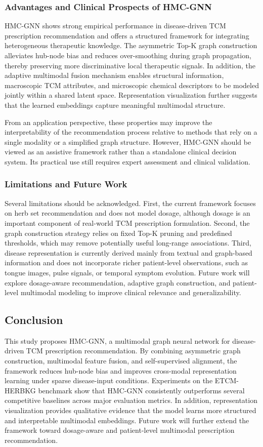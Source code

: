\documentclass[a4paper,fleqn]{cas-dc}
\begin{document}
\subsubsection{Advantages and Clinical Prospects of HMC-GNN}
HMC-GNN shows strong empirical performance in disease-driven TCM prescription recommendation and offers a structured framework for integrating heterogeneous therapeutic knowledge. The asymmetric Top-K graph construction alleviates hub-node bias and reduces over-smoothing during graph propagation, thereby preserving more discriminative local therapeutic signals. In addition, the adaptive multimodal fusion mechanism enables structural information, macroscopic TCM attributes, and microscopic chemical descriptors to be modeled jointly within a shared latent space. Representation visualization further suggests that the learned embeddings capture meaningful multimodal structure.

From an application perspective, these properties may improve the interpretability of the recommendation process relative to methods that rely on a single modality or a simplified graph structure. However, HMC-GNN should be viewed as an assistive framework rather than a standalone clinical decision system. Its practical use still requires expert assessment and clinical validation.

\subsubsection{Limitations and Future Work}
Several limitations should be acknowledged. First, the current framework focuses on herb set recommendation and does not model dosage, although dosage is an important component of real-world TCM prescription formulation. Second, the graph construction strategy relies on fixed Top-K pruning and predefined thresholds, which may remove potentially useful long-range associations. Third, disease representation is currently derived mainly from textual and graph-based information and does not incorporate richer patient-level observations, such as tongue images, pulse signals, or temporal symptom evolution. Future work will explore dosage-aware recommendation, adaptive graph construction, and patient-level multimodal modeling to improve clinical relevance and generalizability.

\subsection{Conclusion}
This study proposes HMC-GNN, a multimodal graph neural network for disease-driven TCM prescription recommendation. By combining asymmetric graph construction, multimodal feature fusion, and self-supervised alignment, the framework reduces hub-node bias and improves cross-modal representation learning under sparse disease-input conditions. Experiments on the ETCM-HERBKG benchmark show that HMC-GNN consistently outperforms several competitive baselines across major evaluation metrics. In addition, representation visualization provides qualitative evidence that the model learns more structured and interpretable multimodal embeddings. Future work will further extend the framework toward dosage-aware and patient-level multimodal prescription recommendation.
\end{document}
